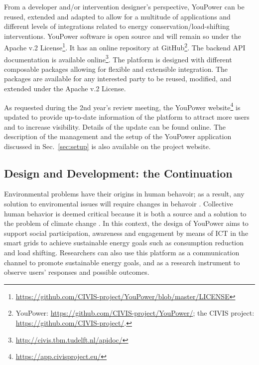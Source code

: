 From a developer and/or intervention designer's perspective, YouPower can be reused, extended and adapted to allow for a multitude of applications and different levels of integrations related to energy conservation/load-shifting interventions. 
YouPower software is open source and will remain so under the Apache v.2 License\footnote{\url{https://github.com/CIVIS-project/YouPower/blob/master/LICENSE}}. It has  an online repository at GitHub\footnote{YouPower: \url{https://github.com/CIVIS-project/YouPower/}; the CIVIS project: \url{https://github.com/CIVIS-project/}.}. 
The backend API documentation is available online\footnote{\url{http://civis.tbm.tudelft.nl/apidoc/}}. 
% 
The platform is designed with different composable packages allowing for flexible and extensible integration. The packages are available for any interested party to be reused, modified, and extended under the Apache v.2 License. 

As requested during the 2nd year's review meeting, the YouPower website\footnote{\url{https://app.civisproject.eu/}} is updated to provide  up-to-date information of the platform to attract more users and to increase visibility. Details of the update can be found online. The description of the management and the setup of the YouPower application discussed in Sec.~\ref{sec:setup} is also available on the project website.




\subsection{Design and Development: the Continuation}

Environmental problems have their origins in human behavoir; as a result, any solution to enviromental issues will require changes in behavoir 
\citep{Schultz2014}.
Collective human behavior is deemed critical because it is both a source and a solution to the problem of climate change \citep{Masson2014}.
In this context, the design of YouPower aims to support social participation, awareness and engagement by means of ICT in the smart grids to achieve sustainable energy goals such as consumption reduction and load shifting. Researchers can also use this platform as a communication channel to promote sustainable energy goals, and as a research instrument to observe users' responses and possible outcomes. 

